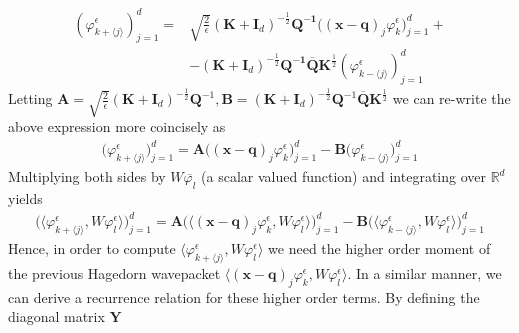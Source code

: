 \begin{equation}
  \begin{split}
  \left( 
  \varphi^\epsilon_{k + \langle j \rangle} \right)_{j=1}^d
  =&
  \sqrt{\frac{2}{\epsilon}}
  (\bm{K} + \bm{I}_d)^{-\frac{1}{2}}\bm{Q^{-1}}
  \Big( (\bm{x} - \bm{q})_j \varphi_k^\epsilon \Big)_{j=1}^d 
  +
  \\
  &-
  (\bm{K} + \bm{I}_d)^{-\frac{1}{2}}
  \bm{Q^{-1}}\bm{\overline{Q}}
  \bm{K}^{\frac{1}{2}}
  \left( \varphi^\epsilon_{k - \langle j \rangle } \right)_{j=1}^d
  \end{split}
\end{equation}
Letting $\bm{A} = \sqrt{\frac{2}{\epsilon}}
(\bm{K} + \bm{I}_d)^{-\frac{1}{2}}\bm{Q}^{-1},
\bm{B} = (\bm{K} + \bm{I}_d)^{-\frac{1}{2}}
          \bm{Q}^{-1}\overline{\bm{Q}}
          \bm{K}^{\frac{1}{2}}$
we can re-write the above expression more coincisely as
\begin{equation}
  \begin{split}
    \Big(\varphi^\epsilon_{k + \langle j \rangle}\Big)_{j=1}^d
    =
    \bm{A} \Big( 
      (\bm{x} - \bm{q})_{j}\varphi^\epsilon_k
    \Big)_{j=1}^d
    - \bm{B} \Big(
      \varphi^\epsilon_{k - \langle j  \rangle}
      \Big)_{j=1}^d
  \end{split}
  \label{hag:dynamics:recurrence:relation:neat}
\end{equation}
Multiplying both sides by $W \overline{\varphi_l}$ 
(a scalar valued function) and 
integrating over $\mathbb{R}^d$ yields 
\begin{equation}
  \begin{split}
    \Big(
    \langle 
      \varphi^\epsilon_{k + \langle j \rangle}
      , W \varphi^\epsilon_l \rangle
    \Big)_{j=1}^d
    =
    \bm{A} \Big( 
      \langle (\bm{x} - \bm{q})_{j}\varphi^\epsilon_k
     , W \varphi^\epsilon_l \rangle
    \Big)_{j=1}^d
    - \bm{B} \Big(
      \langle 
      \varphi^\epsilon_{k - \langle j  \rangle}
      , W \varphi^\epsilon_l \rangle  
    \Big)_{j=1}^d
  \end{split}
  \label{hag:dynamics:recurrence:relation:inner:product}
\end{equation}
Hence, in order to compute
$\langle \varphi^\epsilon_{k + \langle j \rangle}, W \varphi^\epsilon_l  \rangle$ 
we need the higher order moment of the previous Hagedorn wavepacket
$\langle (\bm{x} - \bm{q})_j \varphi^\epsilon_{k}, W \varphi^\epsilon_l \rangle $.
In a similar manner, we can derive a recurrence relation for these higher order terms.
By defining the diagonal matrix $\bm{Y}$ 
